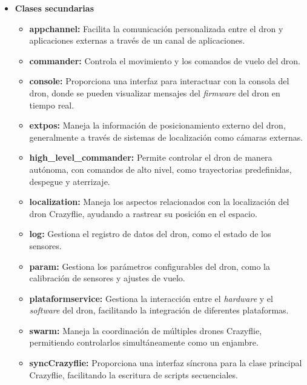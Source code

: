 \begin{itemize}
	\item \textbf{Clases secundarias} 
	\begin{itemize}
		\item \textbf{appchannel:} Facilita la comunicación personalizada entre el dron y aplicaciones externas a través de un canal de aplicaciones.
		\item \textbf{commander:} Controla el movimiento y los comandos de vuelo del dron.
		
		\item \textbf{console:} Proporciona una interfaz para interactuar con la consola del dron, donde se pueden visualizar mensajes del \textit{firmware} del dron en tiempo real.
		
		\item \textbf{extpos:} Maneja la información de posicionamiento externo del dron, generalmente a través de sistemas de localización como cámaras externas.
		
		\item \textbf{high\_level\_commander:} Permite controlar el dron de manera autónoma, con comandos de alto nivel, como trayectorias predefinidas, despegue y aterrizaje.
		
		\item \textbf{localization:} Maneja los aspectos relacionados con la localización del dron Crazyflie, ayudando a rastrear su posición en el espacio.
		
		\item \textbf{log:} Gestiona el registro de datos del dron, como el estado de los sensores.
		
		\item \textbf{param:} Gestiona los parámetros configurables del dron, como la calibración de sensores y ajustes de vuelo.
		
		\item \textbf{plataformservice:} Gestiona la interacción entre el \textit{hardware} y el \textit{software} del dron, facilitando la integración de diferentes plataformas.
		
		\item \textbf{swarm:} Maneja la coordinación de múltiples drones Crazyflie, permitiendo controlarlos simultáneamente como un enjambre.
		
		\item \textbf{syncCrazyflie:} Proporciona una interfaz síncrona para la clase principal Crazyflie, facilitando la escritura de scripts secuenciales.
		

\end{itemize}
\end{itemize}
